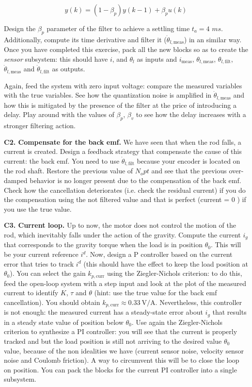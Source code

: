 \documentclass[11pt]{article}
\begin{document}
\begin{equation}
y(k) = (1-\beta_p)y(k-1) + \beta_p u(k)
\end{equation}

Design the $\beta_p$ parameter of the filter to achieve a settling time $t_a = 4$ $ms$.
Additionally, compute its  time derivative and filter it ($\dot{\theta}_{l,\mathrm{meas}}$) in an similar way. 
Once you have completed this exercise, pack all the new blocks so as 
to create the \textit{sensor} subsystem: this should have $i$, 
and $\theta_l$ as inputs and $i_{\mathrm{meas}}$, 
$\theta_{l,\mathrm{meas}}$, $\theta_{l,\mathrm{filt}}$, 
$\dot{\theta}_{l,\mathrm{meas}}$ and $\dot{\theta}_{l,\mathrm{filt}}$ as outputs.

Again, feed the system with zero input voltage: compare the measured variables with the true variables.
See how the quantization noise is amplified in  $\dot{\theta}_{l,\mathrm{meas}}$ and how this is mitigated 
by the presence of the filter at the price of introducing a delay. Play around with the values of $\beta_p$, $\beta_v$ 
to see how the delay increases with a stronger filtering action. 
%
%
\par
\textbf{C2. Compensate for the back emf.} 
We have seen that when the rod falls, a current is created. 
Design a feedback strategy that compensate the cause of this current: 
the back emf. You need to use $\dot{\theta}_{l,\mathrm{filt}}$ because your encoder is located 
on the rod shaft. Restore the previous value of $N_opt$ and see that the previous over-damped behavior 
is no longer present due to the compensation of the back emf. Check how the cancellation deteriorates (i.e. check the residual current)
if you do the compensation using the not filtered value and that is perfect (current = 0 ) if you use the true value. 

\par
\textbf{C3. Current loop.} 
Up to now, the motor does not control the motion of the rod, 
which inevitably falls under the action of the gravity. Compute the current $i_g$ that corresponds to the 
gravity torque when the load is in position $\theta_0$. This will be your current reference $i^d$.
Now, design a P controller based on the current error that tries to track $i^d$ 
(this should have the effect to keep the load position at $\theta_0$). 
You can select the gain $k_{p, \mathrm{curr}}$ using the Ziegler-Nichols criterion: to do this, 
feed the open-loop system with a step input and look at the plot of the 
measured current to identify $K$, $\tau$ and $\theta$  
(hint: use the true value for the back emf cancellation). You should obtain $k_{p, \mathrm{curr}} \approx 0.33 \ \mathrm{V/A}$. 
Nevertheless, this controller is not enough: the measured current has a steady-state error about $i_g$ that results in a steady state value of position below  $\theta_0$.
Use again the Ziegler-Nichols criterion to synthesize a PI controller: 
you will see that the current is properly tracked and but the load position is still  not arriving to the desired value $\theta_0$ value, because of the non idealities we have (current sensor noise, velocity sensor noise and Coulomb friction). 
A way to circumvent this will be to close the loop on position. 
You can pack the blocks for the current PI controller into a single subsystem.
\end{document}
